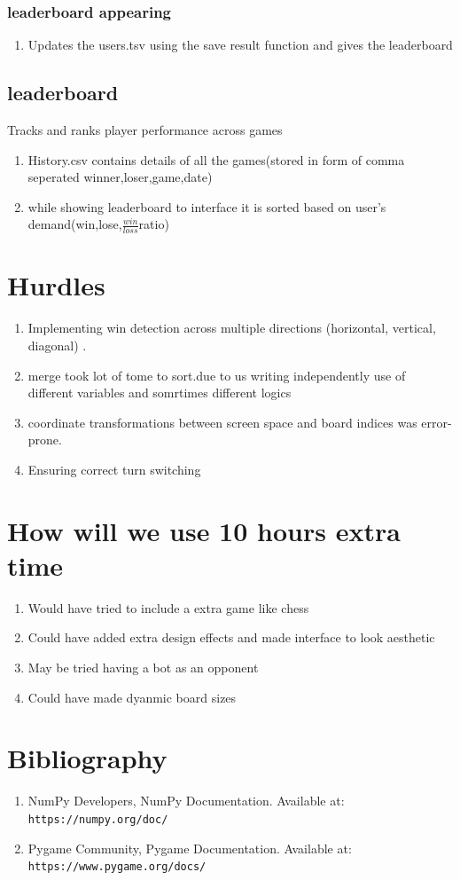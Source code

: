\documentclass{article}
\begin{document}
\subsubsection{leaderboard appearing}
\begin{enumerate}
    \item Updates the users.tsv using the save result function and gives the leaderboard
\end{enumerate}
\subsection{leaderboard}
Tracks and ranks player performance across games
\begin{enumerate}
    \item History.csv contains details of all the games(stored in form of comma seperated winner,loser,game,date)
    \item while showing leaderboard to interface it is sorted based on user's demand(win,lose,$\frac{win}{loss}$ratio)
    
\end{enumerate}
\section{Hurdles}
\begin{enumerate}
    \item Implementing win detection across multiple directions (horizontal, vertical, diagonal) .
    \item merge took lot of tome to sort.due to us writing independently use of different variables and somrtimes different logics
    \item coordinate transformations between screen space and board indices was error-prone.
    \item Ensuring correct turn switching
\end{enumerate}
\section{How will we use 10 hours extra time}
\begin{enumerate}
    \item Would have tried to include a extra game like chess
    \item Could have added extra design effects and made interface to look aesthetic
    \item May be tried having a bot as an opponent 
    \item Could have made dyanmic board sizes
\end{enumerate}
\section{Bibliography}
\begin{enumerate}
 \item NumPy Developers, NumPy Documentation.  
    Available at: \texttt{https://numpy.org/doc/}

 \item Pygame Community, Pygame Documentation.  
    Available at: \texttt{https://www.pygame.org/docs/}
\end{enumerate}
\end{document}
